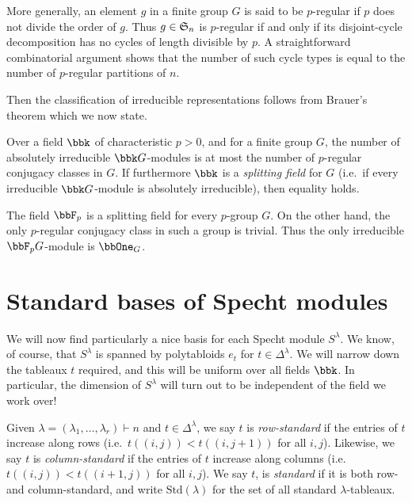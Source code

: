 More generally, an element $g$ in a finite group $G$ is said to be $p$-regular
if $p$ does not divide the order of $g$. Thus $g\in \mathfrak{S}_{n}$ is $p$-regular if
and only if its disjoint-cycle decomposition has no cycles of length divisible
by $p$. A straightforward combinatorial argument shows that the number of such cycle types
is equal to the number of $p$-regular partitions of $n$.

Then the classification of irreducible representations follows from Brauer's
theorem which we now state.

\begin{theorem}[(Brauer)]
    Over a field $\bbk$ of characteristic $p>0$, and for a finite group $G$, the
    number of absolutely irreducible $\bbk G$-modules is at most the number of
    $p$-regular conjugacy classes in $G$. If furthermore $\bbk$ is a
    \emph{splitting field} for $G$ (i.e.\ if every irreducible $\bbk G$-module
    is absolutely irreducible), then equality holds.
\end{theorem}

\begin{example}
    The field $\bbF_p$ is a splitting field for every $p$-group $G$. On the other
    hand, the only $p$-regular conjugacy class in such a group is trivial. Thus
    the only irreducible $\bbF_pG$-module is $\bbOne_G$.
\end{example}

\section{Standard bases of Specht modules}
We will now find particularly a nice basis for each Specht module $S^\lambda$.
We know, of course, that $S^\lambda$ is spanned by polytabloids $e_t$ for $t\in
\Delta^\lambda$. We will narrow down the tableaux $t$ required, and this will be
uniform over all fields $\bbk$. In particular, the dimension of $S^\lambda$ will
turn out to be independent of the field we work over!

\begin{definition}
    Given $\lambda=(\lambda_1,\ldots,\lambda_r)\vdash n$ and $t\in
    \Delta^\lambda$, we say $t$ is \emph{row-standard} if the entries of $t$
    increase along rows (i.e.\ $t((i,j))<t((i,j+1))$ for all $i,j$). Likewise, we say
    $t$ is \emph{column-standard} if the entries of $t$ increase along columns
    (i.e.\ $t((i,j))<t((i+1,j))$ for all $i,j$). We say $t$, is \emph{standard}
    if it is both row- and column-standard, and write $\text{Std}(\lambda)$ for
    the set of all standard $\lambda$-tableaux.
\end{definition}

